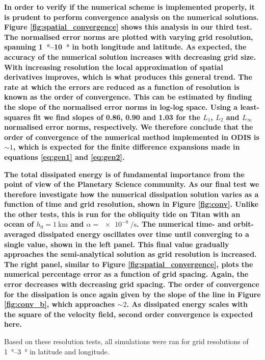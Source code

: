 \textbf{In order to verify if the numerical scheme is implemented properly, it is prudent to perform convergence analysis on the numerical solutions. Figure \ref{fig:spatial_convergence} shows this analysis in our third test. The normalised error norms are plotted with varying grid resolution, spanning \SIrange{1}{10}{\degree} in both longitude and latitude. As expected, the accuracy of the numerical solution increases with decreasing grid size. With increasing resolution the local approximation of spatial derivatives improves, which is what produces this general trend. The rate at which the errors are reduced as a function of resolution is known as the order of convergence. This can be estimated by finding the slope of the normalised error norms in log-log space. Using a least-squares fit we find slopes of \num{0.86}, \num{0.90} and \num{1.03} for the $L_1$, $L_2$ and $L_{\infty}$ normalised error norms, respectively. We therefore conclude that the order of convergence of the numerical method implemented in ODIS is $\sim 1$, which is expected for the finite difference expansions made in equations \ref{eq:gen1} and \ref{eq:gen2}.}

\textbf{The total dissipated energy is of fundamental importance from the point of view of the Planetary Science community. As our final test we therefore investigate how the numerical dissipation solution varies as a function of time and grid resolution, shown in Figure \ref{fig:conv}. Unlike the other tests, this is run for the obliquity tide on Titan with an ocean of $h_0 = \SI{1}{\kilo\metre}$ and $\alpha = \SI{e-8}{\per\second}$. The numerical time- and orbit-averaged dissipated energy oscillates over time until converging to a single value, shown in the left panel. This final value gradually approaches the \citet{matsuyama2014tidal} semi-analytical solution as grid resolution is increased. The right panel, similar to Figure \ref{fig:spatial_convergence}, plots the numerical percentage error as a function of grid spacing. Again, the error decreases with decreasing grid spacing. The order of convergence for the dissipation is once again given by the slope of the line in Figure \ref{fig:conv_b}, which approaches $\sim 2$. As dissipated energy scales with the square of the velocity field, second order convergence is expected here.} 

Based on these resolution tests, all simulations were ran for grid resolutions of \SIrange{1}{3}{\degree} in latitude and longitude.